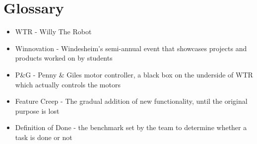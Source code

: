 \section{Glossary}
\begin{itemize}
\item \label{trm::WTR} WTR - Willy The Robot
\item \label{trm::Winnovation} Winnovation - Windesheim's semi-annual event that showcases projects and products worked on by students
\item \label{trm::PGE}P\&G - Penny \& Giles motor controller, a black box on the underside of WTR which actually controls the motors
\item \label{trm::FC} Feature Creep - The gradual addition of new functionality, until the original purpose is lost
\item \label{trm::DOD} Definition of Done - the benchmark set by the team to determine whether a task is done or not
\end{itemize}